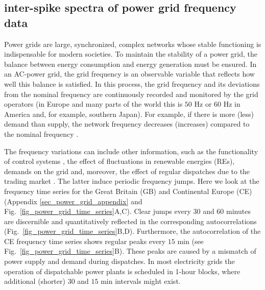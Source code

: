 \documentclass[entropy,article,submit,pdftex,moreauthors]{Definitions/mdpi}
\begin{document}
\subsection{inter-spike spectra of power grid frequency data}\label{sec_power_grid}

Power grids are large, synchronized, complex networks whose stable functioning is indispensable for modern societies.
To maintain the stability of a power grid, the balance between energy consumption and energy generation must be ensured. 
In an AC-power grid, the grid frequency is an observable variable that reflects how well this balance is satisfied. 
In this process, the grid frequency and its deviations from the nominal frequency are continuously recorded and monitored by 
the grid operators (in Europe and many parts of the world this is $50$ \si{Hz} or $60$ \si{Hz} in America and, for example, southern Japan).
For example, if there is more (less) demand than supply, the network frequency decreases (increases) compared to the nominal frequency \cite{kundur1994power}.


The frequency variations can include other information, such as the functionality of control systems \cite{gorjao2020data}, the effect of fluctuations in
renewable energies (REs), demands on the grid \cite{anvari2020stochastic} and, moreover, the effect of regular dispatches due to the trading market 
\cite{meyer2020identifying}. The latter induce periodic frequency jumps. Here we look at the frequency time series for the Great Britain (GB) and Continental Europe 
(CE) (Appendix \ref{sec_power_grid_appendix} and Fig.~\ref{fig_power_grid_time_series}A,C). Clear jumps every 30 and 60 minutes are discernible and quantitatively reflected in the corresponding 
autocorrelations (Fig.~\ref{fig_power_grid_time_series}B,D). Furthermore, the autocorrelation of the CE frequency time series shows regular peaks every $15$ \si{min} 
(see Fig.~\ref{fig_power_grid_time_series}B). These peaks are caused by a mismatch of power supply and demand \cite{weissbach2009high} during dispatches. 
In most electricity grids the operation of dispatchable power plants is scheduled in 1-hour blocks, where additional (shorter) $30$ and $15$ \si{min} intervals
might exist.
\end{document}
